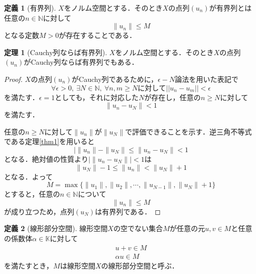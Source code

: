 \documentclass[11pt,a4paper,titlepage]{jsreport}
\theoremstyle{definition}
\newtheorem{dfn}{定義}
\newtheorem{thm}{定理}
\begin{document}
\begin{dfn}[有界列]
  $X$をノルム空間とする．そのとき$X$の点列$(u_n)$が有界列とは任意の$n\in\mathbb{N}$に対して
  \begin{equation*}
    \|u_n\|\leq M
  \end{equation*}
  となる定数$M>0$が存在することである．
\end{dfn}

\begin{thm}[Cauchy列ならば有界列]
  $X$をノルム空間とする．そのとき$X$の点列$(u_n)$がCauchy列ならば有界列でもある．
\end{thm}

\begin{proof}
  $X$の点列$(u_n)$がCauchy列であるために，$\epsilon -N$論法を用いた表記で
  \begin{equation*}
    \forall\epsilon >0, \ \exists N\in \mathbb{N}, \ \forall n,m \geq Nに対して||u_n-u_m||<\epsilon
  \end{equation*}
  を満たす．$\epsilon=1$としても，それに対応した$N$が存在し，任意の$n\geq N$に対して
  \begin{equation*}
    \|u_n-u_N\|<1
  \end{equation*}
  を満たす．

  任意の$n\geq N$に対して$\|u_n\|$が$\|u_N\|$で評価できることを示す．逆三角不等式である定理\ref{thm1}を用いると
  \begin{equation*}
    |\|u_n\|-\|u_N\|\leq \|u_n-u_N\|<1
  \end{equation*}
  となる．絶対値の性質より$|\|u_n-u_N\||<1$は
  \begin{equation*}
    \|u_N\|-1\leq\|u_n\|<\|u_N\|+1
  \end{equation*}
  となる．よって
  \begin{equation*}
    M=\max\{\|u_1\|,\|u_2\|,\cdots,\|u_{N-1}\|,\|u_N\|+1\}
  \end{equation*}
  とすると，任意の$n\in \mathbb{N}について$
  \begin{equation*}
    \|u_n\|\leq M
  \end{equation*}
  が成り立つため，点列$(u_N)$は有界列である．
\end{proof}

\begin{dfn}[線形部分空間]
  線形空間$X$の空でない集合$M$が任意の元$u,v\in M$と任意の係数体$\alpha\in\mathbb{K}$に対して
  \begin{align*}
    u+v\in M \\
    \alpha u \in M
  \end{align*}
  を満たすとき，$M$は線形空間$X$の線形部分空間と呼ぶ．
\end{dfn}
\end{document}
